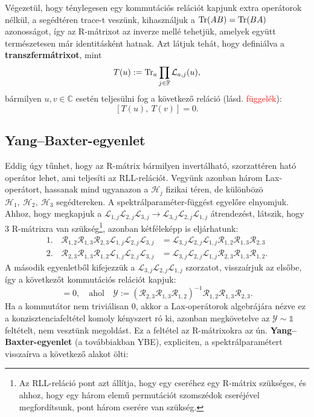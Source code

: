 \documentclass[12pt,a4paper,oneside]{report}
\newcommand{\R}{\mathcal{R}}
\renewcommand{\L}{\mathcal{L}}
\newcommand{\id}{\mathds{1}}
\newcommand{\C}{\mathbb{C}}
\newcommand{\F}{\mathbb{F}}
\newcommand{\Hil}{\mathscr{H}}
\newcommand{\ahol}{\quad \text{ahol} \quad}
\begin{document}
Végezetül, hogy ténylegesen egy kommutációs relációt kapjunk extra operátorok nélkül, a segédtéren trace-t veszünk, kihasználjuk a $\operatorname{Tr}(AB)=\operatorname{Tr}(BA)$ azonosságot, így az R-mátrixot az inverze mellé tehetjük, amelyek együtt természetesen már identitásként hatnak. Azt látjuk tehát, hogy definiálva a \textbf{transzfermátrixot}, mint
\begin{gather}\label{eq:tarnsfermat}
    T(u):=\Tr_a\prod_{j\in\F}\L_{a,j}(u),
\end{gather}
bármilyen $u,v\in \C$ esetén teljesülni fog a következő reláció (lásd. \textcolor{red}{függelék}):
\begin{equation}\label{eq:transfer_comm}
    [T(u),\ T(v)]=0.
\end{equation}

\subsection{Yang--Baxter-egyenlet}
Eddig úgy tűnhet, hogy az R-mátrix bármilyen invertálható, szorzattéren ható operátor lehet, ami teljesíti az RLL-relációt. Vegyünk azonban három Lax-operátort, hassanak mind ugyanazon a $\Hil_j$ fizikai téren, de különbözö $\Hil_1,\ \Hil_2,\ \Hil_3$ segédtereken. A spektrálparaméter-függést egyelőre elnyomjuk. Ahhoz, hogy megkapjuk a $\L_{1,j}\L_{2,j}\L_{3,j}\rightarrow\L_{3,j}\L_{2,j}\L_{1,j}$ átrendezést, látszik, hogy 3 R-mátrixra van szükség\footnote{Az RLL-reláció pont azt állítja, hogy egy cseréhez egy R-mátrix szükséges, és ahhoz, hogy egy három elemű permutációt szomszédok cseréjével megfordítsunk, pont három cserére van szükség.}, azonban kétféleképp is eljárhatunk:
\begin{align}
    1.\quad \R_{1,2}\R_{1,3}\R_{2,3}\L_{1,j}\L_{2,j}\L_{3,j}&=\L_{3,j}\L_{2,j}\L_{1,j}\R_{1,2}\R_{1,3}\R_{2,3} \\
    2.\quad \R_{2,3}\R_{1,3}\R_{1,2}\L_{1,j}\L_{2,j}\L_{3,j}&=\L_{3,j}\L_{2,j}\L_{1,j}\R_{2,3}\R_{1,3}\R_{1,2}.
\end{align}
A második egyenletből kifejezzük a $\L_{3,j}\L_{2,j}\L_{1,j}$ szorzatot, visszaírjuk az elsőbe, így a következőt kommutációs relációt kapjuk:
\begin{equation}
    [\L_{1,j}\L_{2,j}\L_{3,j},\ \mathcal{Y}]=0, \ahol \mathcal{Y}:=(\R_{2,3}\R_{1,3}\R_{1,2})^{-1}\R_{1,2}\R_{1,3}\R_{2,3}.
\end{equation}
Ha a kommutátor nem triviálisan 0, akkor a Lax-operátorok algebrájára nézve ez a konzisztenciafeltétel komoly kényszert ró ki, azonban megkövetelve az $\mathcal{Y}\sim \id$ feltételt, nem vesztünk megoldást. Ez a feltétel az R-mátrixokra az ún. \textbf{Yang--Baxter-egyenlet} (a továbbiakban YBE), expliciten, a spektrálparamétert visszaírva a következő alakot ölti:
\end{document}
